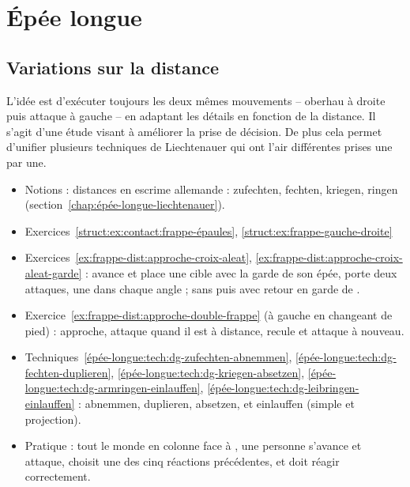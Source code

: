 \section{Épée longue}


\subsection{Variations sur la distance}



L'idée est d'exécuter toujours les deux mêmes mouvements – oberhau à droite puis attaque à gauche – en adaptant les détails en fonction de la distance.
Il s'agit d'une étude visant à améliorer la prise de décision.
De plus cela permet d'unifier plusieurs techniques de Liechtenauer qui ont l'air différentes prises une par une.


\begin{itemize}
	\item Notions : distances en escrime allemande : zufechten, fechten, kriegen, ringen (section~\ref{chap:épée-longue-liechtenauer}).
	\item Exercices~\ref{struct:ex:contact:frappe-épaules}, \ref{struct:ex:frappe-gauche-droite}
	\item Exercices~\ref{ex:frappe-dist:approche-croix-aleat}, \ref{ex:frappe-dist:approche-croix-aleat-garde} : \D avance et place une cible avec la garde de son épée, \A porte deux attaques, une dans chaque angle ; sans puis avec retour en garde de \A.
	\item Exercice~\ref{ex:frappe-dist:approche-double-frappe} (à gauche en changeant de pied) : \D approche, \A attaque quand il est à distance, \D recule et \A attaque à nouveau.
	\item Techniques~\ref{épée-longue:tech:dg-zufechten-abnemmen}, \ref{épée-longue:tech:dg-fechten-duplieren}, \ref{épée-longue:tech:dg-kriegen-absetzen}, \ref{épée-longue:tech:dg-armringen-einlauffen}, \ref{épée-longue:tech:dg-leibringen-einlauffen} : abnemmen, duplieren, absetzen, et einlauffen (simple et projection).
	\item Pratique : tout le monde en colonne face à \D, une personne \A s'avance et attaque, \D choisit une des cinq réactions précédentes, et \A doit réagir correctement.
\end{itemize}

